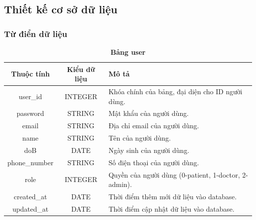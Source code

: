 \subsection{Thiết kế cơ sở dữ liệu}
\label{design_database}

\subsubsection{Từ điển dữ liệu}

\begin{table}[H]
  \caption{\bfseries \fontsize{12pt}{0pt}\selectfont Bảng user}
  \centering
  \begin{tabularx}{0.9\textwidth}{|c|c|X|}
    \hline
    \textbf{Thuộc tính} & \textbf{Kiểu dữ liệu} & \textbf{Mô tả} \\
    \hline
    user\_id & INTEGER & Khóa chính của bảng, đại diện cho ID người dùng. \\
    \hline
    password & STRING & Mật khẩu của người dùng. \\
    \hline
    email & STRING & Địa chỉ email của người dùng. \\
    \hline
    name & STRING & Tên của người dùng. \\
    \hline
    doB & DATE & Ngày sinh của người dùng. \\
    \hline
    phone\_number & STRING & Số điện thoại của người dùng. \\
    \hline
    role & INTEGER & Quyền của người dùng (0-patient, 1-doctor, 2-admin). \\
    \hline
    created\_at & DATE & Thời điểm thêm mới dữ liệu vào database. \\
    \hline
    updated\_at & DATE & Thời điểm cập nhật dữ liệu vào database. \\
    \hline
    
  \end{tabularx}
\end{table}

